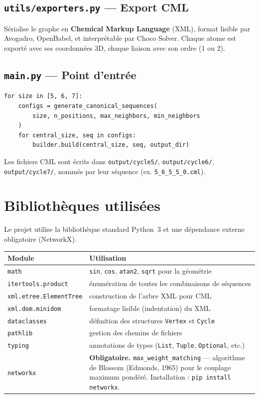 \documentclass[a4paper,12pt]{article}
\begin{document}
\subsection{\texttt{utils/exporters.py} — Export CML}

Sérialise le graphe en \textbf{Chemical Markup Language} (XML), format lisible par Avogadro,
OpenBabel, et interprétable par Choco Solver. Chaque atome est exporté avec ses coordonnées 3D,
chaque liaison avec son ordre (1 ou 2).

\subsection{\texttt{main.py} — Point d'entrée}

\begin{lstlisting}
for size in [5, 6, 7]:
    configs = generate_canonical_sequences(
        size, n_positions, max_neighbors, min_neighbors
    )
    for central_size, seq in configs:
        builder.build(central_size, seq, output_dir)
\end{lstlisting}

Les fichiers CML sont écrits dans \texttt{output/cycle5/}, \texttt{output/cycle6/},
\texttt{output/cycle7/}, nommés par leur séquence (ex. \texttt{5\_6\_5\_5\_0.cml}).

\section{Bibliothèques utilisées}

Le projet utilise la bibliothèque standard Python~3 et une dépendance externe obligatoire
(NetworkX).

\begin{center}
\begin{tabular}{lp{9cm}}
  \toprule
  Module & Utilisation \\
  \midrule
  \texttt{math} & \texttt{sin}, \texttt{cos}, \texttt{atan2}, \texttt{sqrt} pour la géométrie \\
  \texttt{itertools.product} & énumération de toutes les combinaisons de séquences \\
  \texttt{xml.etree.ElementTree} & construction de l'arbre XML pour CML \\
  \texttt{xml.dom.minidom} & formatage lisible (indentation) du XML \\
  \texttt{dataclasses} & définition des structures \texttt{Vertex} et \texttt{Cycle} \\
  \texttt{pathlib} & gestion des chemins de fichiers \\
  \texttt{typing} & annotations de types (\texttt{List}, \texttt{Tuple}, \texttt{Optional}, etc.) \\
  \midrule
  \texttt{networkx} & \textbf{Obligatoire.} \texttt{max\_weight\_matching} — algorithme de
    Blossom (Edmonds, 1965) pour le couplage maximum pondéré.
    Installation : \texttt{pip install networkx}. \\
  \bottomrule
\end{tabular}
\end{center}
\end{document}
